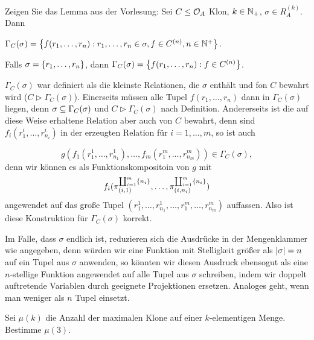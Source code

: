 \documentclass{book}
\begin{document}
\begin{exercise}
    Zeigen Sie das Lemma aus der Vorlesung:
    Sei $C\leq \mathcal{O}_A$ Klon, $k\in\mathbb{N}_+$, $\sigma\in R_A^{(k)}$. Dann
    \begin{statements}
            \item $\Gamma_C(\sigma)=\left\{f(r_1,\ldots,r_n):r_1,\ldots,r_n\in\sigma,f\in C^{(n)},n\in\mathbb{N}^+\right\}$.
        \item Falls $\sigma=\left\{r_1,\ldots,r_n\right\}$, dann $\Gamma_C(\sigma)=\left\{f(r_1,\ldots,r_n):f\in C^{(n)}\right\}$.
    \end{statements}
\end{exercise}

\begin{solution}
    \begin{tasks}
        \item $\Gamma_C(\sigma)$ war definiert als die kleinste Relationen, die $\sigma$ enthält und fon $C$ bewahrt wird ($C\rhd \Gamma_C(\sigma)$). Einerseits müssen alle Tupel $f(r_1,\ldots,r_n)$ dann in $\Gamma_C(\sigma)$ liegen, denn $\sigma\subseteq\Gamma_C(\sigma)$ und $C\rhd \Gamma_C(\sigma)$ nach Definition.
    Andererseits ist die auf diese Weise erhaltene Relation aber auch von $C$ bewahrt, denn sind $f_i(r^i_1,\ldots,r^i_{n_i})$ in der erzeugten Relation für $i=1,\ldots,m$, so ist auch

    $$
    g(f_1(r^1_1,\ldots,r^1_{n_1}),\ldots,f_m(r^m_1,\ldots,r^m_{n_m}))\in\Gamma_C(\sigma),
    $$
    denn wir können es als Funktionskompositoin von $g$ mit
    $$f_i(\pi^{\coprod_{i=1}^m\left\{n_i\right\}}_{(i,1)},\ldots,\pi^{\coprod_{i=1}^m\left\{n_i\right\}}_{(i,n_i)})$$
    angewendet auf das große Tupel $(r^1_1,\ldots,r^1_{n_1},\ldots,r^m_1,\ldots,r^m_{n_m})$ auffassen. Also ist diese Konstruktion für $\Gamma_C(\sigma)$ korrekt.
        \item Im Falle, dass $\sigma$ endlich ist, reduzieren sich die Ausdrücke in der Mengenklammer wie angegeben, denn würden wir eine Funktion mit Stelligkeit größer als $\left|\sigma\right|=n$ auf ein Tupel aus $\sigma$ anwenden, so könnten wir diesen Ausdruck ebensogut als eine $n$-stellige Funktion angewendet auf alle Tupel aus $\sigma$ schreiben, indem wir doppelt auftretende Variablen durch geeignete Projektionen ersetzen.
    Analoges geht, wenn man weniger als $n$ Tupel einsetzt.
    \end{tasks}
\end{solution}

\begin{exercise}
    Sei $\mu(k)$ die Anzahl der maximalen Klone auf einer $k$-elementigen Menge. Bestimme $\mu(3)$.
\end{exercise}
\end{document}
